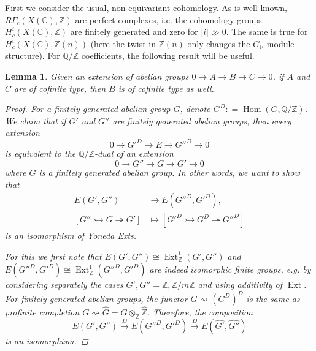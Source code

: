 \documentclass{article}
\DeclareMathOperator{\Ext}{Ext}
\DeclareMathOperator{\Hom}{Hom}
\newcommand{\CC}{\mathbb{C}}
\newcommand{\QQ}{\mathbb{Q}}
\newcommand{\RR}{\mathbb{R}}
\newcommand{\ZZ}{\mathbb{Z}}
\newcommand{\dfn}{\mathrel{\mathop:}=}
\newtheorem{lemma}[theorem]{Lemma}
\theoremstyle{definition}
\numberwithin{equation}{section}
\begin{document}
First we consider the usual, non-equivariant cohomology. As is well-known,
$R\Gamma_c (X (\CC), \ZZ)$ are perfect complexes, i.e. the cohomology groups
$H^i_c (X (\CC), \ZZ)$ are finitely generated and zero for $|i| \gg 0$.  The
same is true for $H^i_c (X (\CC), \ZZ (n))$ (here the twist in $\ZZ (n)$ only
changes the $G_\RR$-module structure). For $\QQ/\ZZ$ coefficients, the following
result will be useful.

\begin{lemma}
  \label{lemma:extensions-of-cofinite-type-groups}
  Given an extension of abelian groups
  $0 \to A \to B \to C \to 0$,
  if $A$ and $C$ are of cofinite type, then $B$ is of cofinite type as well.

  \begin{proof}
    For a finitely generated abelian group $G$, denote
    $G^D \dfn \Hom (G, \QQ/\ZZ)$.  We claim that if $G'$ and $G''$ are finitely
    generated abelian groups, then every extension
    $$0 \to G'^D \to E \to G''^D \to 0$$
    is equivalent to the $\QQ/\ZZ$-dual of an extension
    $$0 \to G'' \to G \to G' \to 0$$
    where $G$ is a finitely generated abelian group. In other words,
    we want to show that
    \begin{align*}
      E (G',G'') & \to E (G''^D,G'^D),\\
      [G'' \rightarrowtail G \twoheadrightarrow G'] & \mapsto
      [G'^D \rightarrowtail G^D \twoheadrightarrow G''^D]
    \end{align*}
    is an isomorphism of Yoneda Exts.

    For this we first note that $E (G',G'') \cong \Ext_\ZZ^1 (G',G'')$ and
    $E (G''^D, G'^D) \cong \Ext_\ZZ^1 (G''^D, G'^D)$ are indeed isomorphic
    finite groups, e.g. by considering separately the cases
    $G', G'' = \ZZ, \ZZ/m\ZZ$ and using additivity of $\Ext$. For finitely
    generated abelian groups, the functor $G \rightsquigarrow (G^D)^D$ is the
    same as profinite completion
    $G \rightsquigarrow \widehat{G} = G\otimes_\ZZ \widehat{\ZZ}$. Therefore,
    the composition
    \[ E (G',G'') \xrightarrow{D}
    E (G''^D,G'^D) \xrightarrow{D}
    E (\widehat{G'},\widehat{G''}) \]
    is an isomorphism.
  \end{proof}
\end{lemma}
\end{document}
